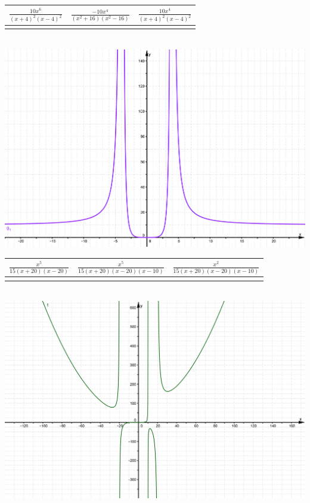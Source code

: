 \documentclass[a4paper,spanish]{exam}
\newcommand{\Ts}{\rule{0pt}{2.8ex}}       %
\newcommand{\Bs}{\rule[-1.5ex]{0pt}{0pt}} %
\begin{document}
\begin{enumerate}
\begin{minipage}{0.5\textwidth}
\centering
\label{mc1}
\begin{tabular}{|c|c|c|}
\hline
$\frac{10x^6}{(x+4)^2(x-4)^2}$  & $\frac{-10x^4}{(x^2+16)(x^2-16)}$ & $\frac{10x^4}{(x+4)^2(x-4)^2}$ \Ts \Bs   \\ \hline
   &   &      \\ \hline
\end{tabular}\\
\centering
\includegraphics[width= 0.95\linewidth]{problematema11.png}
\end{minipage}
\begin{minipage}{.5\textwidth}
\centering
\begin{tabular}{|c|c|c|}
\hline
$\frac{x^5}{15(x+20)(x-20)}$  & $\frac{x^5}{15(x+20)(x-20)(x-10)}$ & $\frac{x^2}{15(x+20)(x-20)(x-10)}$ \Ts \Bs   \\ \hline
   &   &      \\ \hline
\end{tabular}\\
\centering
\includegraphics[width= 0.95\linewidth]{problematemarec13.png}
\end{minipage}



\end{enumerate}
\end{document}
